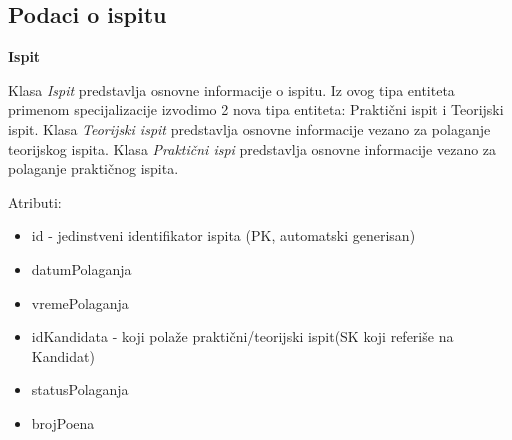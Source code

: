 \subsection{Podaci o ispitu}

\textbf{\large Ispit}
\vspace{0.3cm}

Klasa \textit{Ispit} predstavlja osnovne informacije o ispitu. 
Iz ovog tipa entiteta primenom specijalizacije izvodimo 2 nova tipa entiteta: Praktični ispit i Teorijski ispit.
Klasa \textit{Teorijski ispit} predstavlja osnovne informacije vezano za polaganje teorijskog ispita.
Klasa \textit{Praktični ispi} predstavlja osnovne informacije vezano za polaganje praktičnog ispita.

Atributi:
\begin{itemize}
    \item id - jedinstveni identifikator ispita (PK, automatski generisan)
    \item datumPolaganja 
    \item vremePolaganja
    \item idKandidata - koji polaže praktični/teorijski ispit(SK koji referiše na Kandidat)
    \item statusPolaganja
    \item brojPoena 
\end{itemize}





